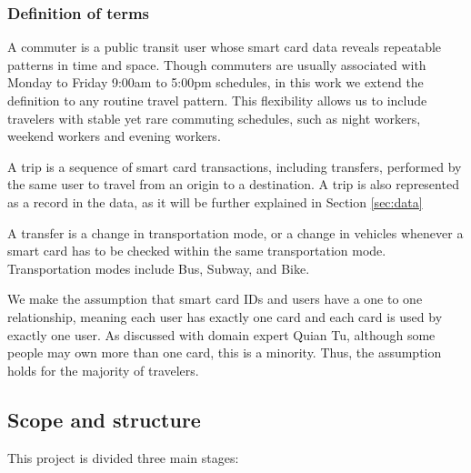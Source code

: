 \documentclass{article}
\begin{document}
\subsubsection{Definition of terms}
A commuter is a public transit user whose smart card data reveals repeatable patterns in time and space. Though commuters are usually associated with Monday to Friday 9:00am to 5:00pm schedules, in this work we extend the definition to any routine travel pattern. This flexibility allows us to include travelers with stable yet rare commuting schedules, such as night workers, weekend workers and evening workers.

A trip is a sequence of smart card transactions, including transfers, performed by the same user to travel from an origin to a destination. A trip is also represented as a record in the data, as it will be further explained in Section \ref{sec:data}

A transfer is a change in transportation mode, or a change in vehicles whenever a smart card has to be checked within the same transportation mode. Transportation modes include Bus, Subway, and Bike. 

We make the assumption that smart card IDs and users have a one to one relationship, meaning each user has exactly one card and each card is used by exactly one user. As discussed with domain expert Quian Tu, although some people may own more than one card, this is a minority. Thus, the assumption holds for the majority of travelers. 

\subsection{Scope and structure}
This project is divided three main stages: 
\end{document}
